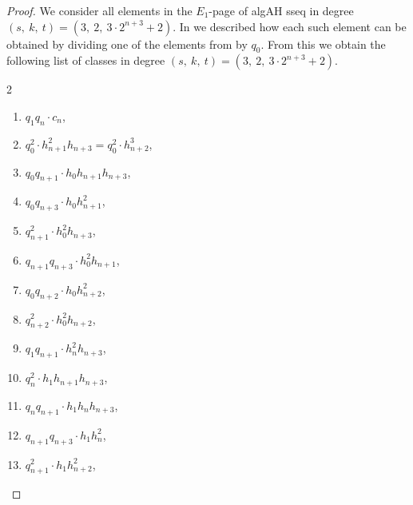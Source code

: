 \begin{proof}
  We consider all elements in the $E_1$-page of algAH sseq in degree 
  $ (s, \ k, \ t)=(3, \ 2, \ 3\cdot 2^{n+3} + 2) $.
  In  we described how each such element can be obtained by dividing one of the elements from  by $q_0$.
  From this we obtain the following list of classes in degree $ (s, \ k, \ t)=(3, \ 2, \ 3\cdot 2^{n+3} + 2) $.

\begin{multicols}{2}
\begin{enumerate}
\item $q_1q_n \cdot c_n$,
\item $q_0^2 \cdot h_{n+1}^2h_{n+3} = q_0^2 \cdot h_{n+2}^3$,
\item $q_0q_{n+1} \cdot h_0h_{n+1}h_{n+3}$,
\item $q_0q_{n+3} \cdot h_0h_{n+1}^2$,
\item $q_{n+1}^2 \cdot h_0^2h_{n+3}$,
\item $q_{n+1}q_{n+3} \cdot h_0^2h_{n+1}$,
\item $q_0q_{n+2} \cdot h_0h_{n+2}^2$,
\item $q_{n+2}^2 \cdot h_0^2h_{n+2}$,
\item $q_1q_{n+1} \cdot h_{n}^2h_{n+3}$,
\item $q_{n}^2 \cdot h_1h_{n+1}h_{n+3}$,
\item $q_nq_{n+1} \cdot h_1h_{n}h_{n+3}$,
\item $q_{n+1}q_{n+3} \cdot h_1h_{n}^2$,
\item $q_{n+1}^2 \cdot h_1h_{n+2}^2$,

\end{enumerate}
\end{multicols}
\end{proof}
